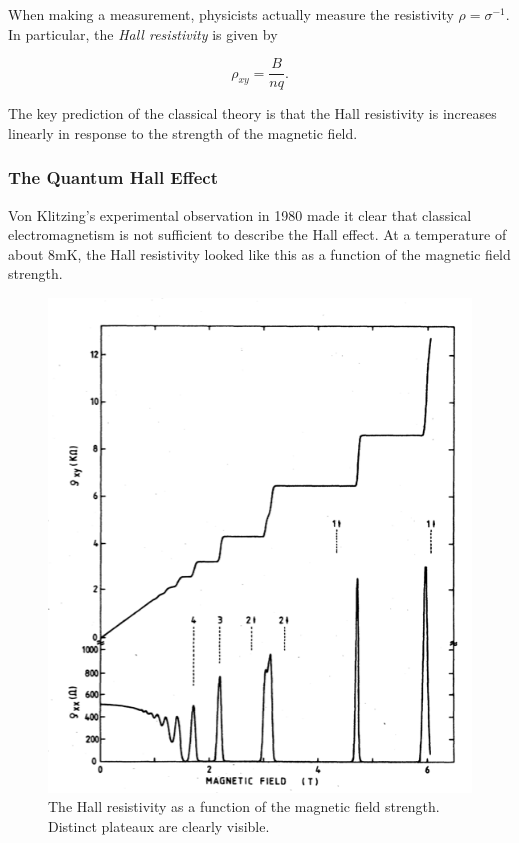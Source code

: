 \documentclass[12pt, letterpaper]{article}
\begin{document}
When making a measurement, physicists actually measure the resistivity $\rho = \sigma^{-1}$. In particular, the \emph{Hall resistivity} is given by 

\[\rho_{xy} = \frac{B}{nq}.\]

The key prediction of the classical theory is that the Hall resistivity is increases linearly in response to the strength of the magnetic field.

\newpage
\subsubsection{The Quantum Hall Effect}

Von Klitzing's experimental observation in 1980 made it clear that classical electromagnetism is not sufficient to describe the Hall effect. At a temperature of about 8mK, the Hall resistivity looked like this as a function of the magnetic field strength.

\begin{figure}[h!]
\centering
\includegraphics{vonklitzing}
\caption{The Hall resistivity as a function of the magnetic field strength. Distinct plateaux are clearly visible.}
\label{fig:vonklitzing}
\end{figure}
\end{document}
